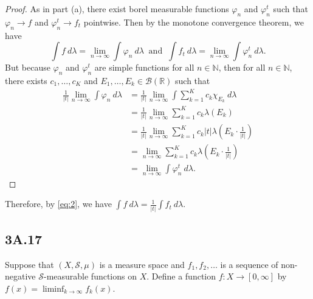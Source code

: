 \documentclass[12pt]{article}
\newcommand{\R}{\mathbb{R}}
\newcommand{\N}{\mathbb{N}}
\newcommand{\al}[1]{\begin{align*}#1\end{align*}}
\newcommand{\qeq}[1]{\begin{equation}#1\end{equation}}
\begin{document}
\begin{itemize}
    \begin{proof}
        As in part (a), there exist borel measurable functions $\varphi_n$ and $\varphi_n^t$ such that $\varphi_n \to f$ and $\varphi_n^t \to f_t$ pointwise. Then by the monotone convergence theorem, we have \qeq{\int f ~d \lambda = \lim_{n \to \infty} \int \varphi_n ~d \lambda ~ \text{ and } ~ \int f_t ~d \lambda = \lim_{n \to \infty} \int \varphi_n^t ~d \lambda. \label{eq:2}} But because $\varphi_n$ and $\varphi_n^t$ are simple functions for all $n \in \N$, then for all $n \in \N$, there exists $c_1, \ldots, c_K$ and $E_1, \ldots, E_k \in \mathcal{B}(\R)$ such that
        \al{\frac{1}{|t|}\lim_{n \to \infty} \int \varphi_n ~d \lambda
            &= \frac{1}{|t|} \lim_{n \to \infty} \int \sum_{k=1}^{K} c_k \chi_{E_k} ~d \lambda \\
            &= \frac{1}{|t|} \lim_{n \to \infty} \sum_{k=1}^{K} c_k \lambda(E_k) \\
            &= \frac{1}{|t|} \lim_{n \to \infty} \sum_{k=1}^{K} c_k |t| \lambda(E_k \cdot \frac{1}{|t|}) \\
            &= \lim_{n \to \infty} \sum_{k=1}^{K} c_k \lambda(E_k \cdot \frac{1}{|t|}) \\
            &= \lim_{n \to \infty} \int \varphi_n^t ~d \lambda.}
    \end{proof}
    Therefore, by \eqref{eq:2}, we have $\int f ~d \lambda = \frac{1}{|t|} \int f_t ~d \lambda$.
\end{itemize}

\subsection*{3A.17}

Suppose that $(X, \mathcal{S}, \mu)$ is a measure space and $f_1, f_2, \ldots$ is a sequence of non-negative $\mathcal{S}$-measurable functions on $X$. Define a function $f : X \to [0, \infty]$ by $f(x) = \liminf_{k \to \infty} f_k(x)$.
\end{document}
